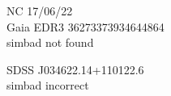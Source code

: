NC 17/06/22\\
Gaia EDR3 36273373934644864\\
simbad not found

SDSS J034622.14+110122.6\\
simbad incorrect